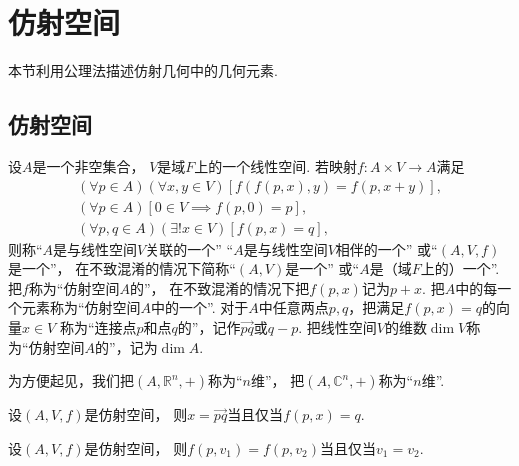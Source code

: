 \section{仿射空间}
本节利用公理法描述仿射几何中的几何元素.

\subsection{仿射空间}
\begin{definition}
设\(A\)是一个非空集合，
\(V\)是域\(F\)上的一个线性空间.
若映射\(f\colon A \times V \to A\)满足\begin{gather*}
	(\forall p \in A)
	(\forall x,y \in V)
	[
		f(f(p,x),y)
		= f(p,x+y)
	], \\
	(\forall p \in A)
	[
		0 \in V
		\implies
		f(p,0) = p
	], \\
	(\forall p,q \in A)
	(\exists! x \in V)
	[
		f(p,x) = q
	],
\end{gather*}
则称“\(A\)是与线性空间\(V\)关联的一个”
“\(A\)是与线性空间\(V\)相伴的一个”
或“\((A,V,f)\)是一个”，
在不致混淆的情况下简称“\((A,V)\)是一个”
或“\(A\)是（域\(F\)上的）一个”.
把\(f\)称为“仿射空间\(A\)的”，
在不致混淆的情况下把\(f(p,x)\)记为\(p + x\).
把\(A\)中的每一个元素称为“仿射空间\(A\)中的一个”.
对于\(A\)中任意两点\(p,q\)，把满足\(f(p,x) = q\)的向量\(x \in V\)
称为“连接点\(p\)和点\(q\)的”，记作\(\vec{pq}\)或\(q - p\).
把线性空间\(V\)的维数\(\dim V\)称为“仿射空间\(A\)的”，记为\(\dim A\).
\end{definition}

为方便起见，我们把\((A,\mathbb{R}^n,+)\)称为“\(n\)维”，
把\((A,\mathbb{C}^n,+)\)称为“\(n\)维”.

\begin{property}%
设\((A,V,f)\)是仿射空间，
则\(x = \vec{pq}\)当且仅当\(f(p,x) = q\).
\end{property}

\begin{property}%
设\((A,V,f)\)是仿射空间，
则\(f(p,v_1) = f(p,v_2)\)当且仅当\(v_1 = v_2\).
\end{property}

